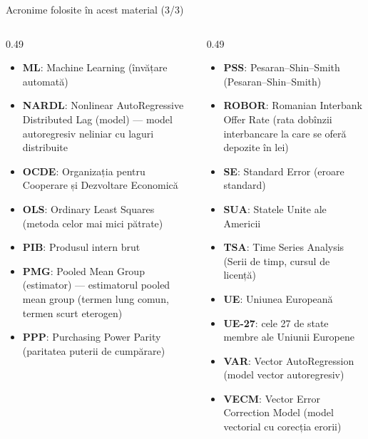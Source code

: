 \begin{frame}{Acronime folosite în acest material (3/3)}
\begin{columns}[T]
\begin{column}{0.49\textwidth}
\begin{itemize}\setlength{\itemsep}{0pt}
    \item \textbf{ML}: Machine Learning (învățare automată)
    \item \textbf{NARDL}: Nonlinear AutoRegressive Distributed Lag (model) — model autoregresiv neliniar cu laguri distribuite
    \item \textbf{OCDE}: Organizația pentru Cooperare și Dezvoltare Economică
    \item \textbf{OLS}: Ordinary Least Squares (metoda celor mai mici pătrate)
    \item \textbf{PIB}: Produsul intern brut
    \item \textbf{PMG}: Pooled Mean Group (estimator) — estimatorul pooled mean group (termen lung comun, termen scurt eterogen)
    \item \textbf{PPP}: Purchasing Power Parity (paritatea puterii de cumpărare)
\end{itemize}
\end{column}
\begin{column}{0.49\textwidth}
\begin{itemize}\setlength{\itemsep}{0pt}
    \item \textbf{PSS}: Pesaran–Shin–Smith (Pesaran–Shin–Smith)
    \item \textbf{ROBOR}: Romanian Interbank Offer Rate (rata dobînzii interbancare la care se oferă depozite în lei)
    \item \textbf{SE}: Standard Error (eroare standard)
    \item \textbf{SUA}: Statele Unite ale Americii
    \item \textbf{TSA}: Time Series Analysis (Serii de timp, cursul de licență)
    \item \textbf{UE}: Uniunea Europeană
    \item \textbf{UE-27}: cele 27 de state membre ale Uniunii Europene
    \item \textbf{VAR}: Vector AutoRegression (model vector autoregresiv)
    \item \textbf{VECM}: Vector Error Correction Model (model vectorial cu corecția erorii)
\end{itemize}
\end{column}
\end{columns}
\end{frame}

